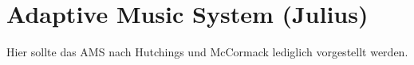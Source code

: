 \section{Adaptive Music System (Julius)}

Hier sollte das AMS nach Hutchings und McCormack lediglich vorgestellt werden.